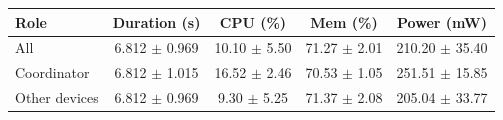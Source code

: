 \begin{tabular}{lcccc}
\hline
\textbf{Role} & \textbf{Duration (s)} & \textbf{CPU (\%)} & \textbf{Mem (\%)} & \textbf{Power (mW)} \\
\hline
All & 6.812 $\pm$ 0.969 & 10.10 $\pm$ 5.50 & 71.27 $\pm$ 2.01 & 210.20 $\pm$ 35.40 \\
Coordinator & 6.812 $\pm$ 1.015 & 16.52 $\pm$ 2.46 & 70.53 $\pm$ 1.05 & 251.51 $\pm$ 15.85 \\
Other devices & 6.812 $\pm$ 0.969 & 9.30 $\pm$ 5.25 & 71.37 $\pm$ 2.08 & 205.04 $\pm$ 33.77 \\
\hline
\end{tabular}
